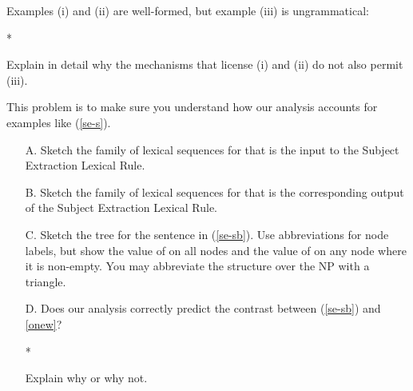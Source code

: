\documentclass[a4paper,landscape,headrule,footrule]{foils}
\begin{document}

Examples (i) and (ii) are well-formed, but example (iii) is
ungrammatical:

\begin{exe}
  
 
 *
\end{exe}
Explain in detail why the mechanisms that license (i) and (ii) do not
also permit (iii).


This problem is to make sure you understand how our
analysis accounts for examples like (\ref{se-s}).

\begin{exe}
\ex \label{se-s}
\begin{xlisti}
\ex \label{se-sa}
\ex \label{se-sb} 
\end{xlisti}
\end{exe}

\begin{itemize}
\item [A.] Sketch the family of lexical sequences for  that is the input
to the Subject Extraction Lexical Rule.

\item [B.] Sketch the family of lexical sequences for  that is the
corresponding output of the Subject Extraction Lexical Rule.


\item[C.] Sketch the %
tree for the sentence in (\ref{se-sb}).
Use abbreviations for node labels, but show the value of  on
all nodes and the value of  on any node where it is non-empty.
You may abbreviate the structure over the NP  with a triangle.

\item[D.] Does our analysis correctly predict the contrast between
(\ref{se-sb}) and \ref{onew}?\\
\begin{exe}
  \ex \label{onew} *
\end{exe}
Explain why or why not.
\end{itemize}
\end{document}
